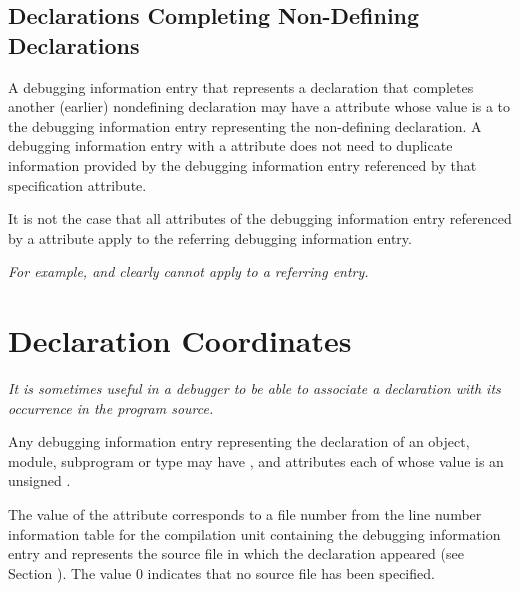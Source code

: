 \subsection{Declarations Completing Non-Defining Declarations}
A debugging information entry that represents a 
\hypertarget{chap:DWATspecificationincompletenondefiningorseparatedeclaration}{}
declaration that completes another (earlier) 
non\dash defining declaration may have a 
\DWATspecification{}
attribute whose value is a  to
the debugging information entry representing the non-defining declaration. A debugging
information entry with a 
\DWATspecification{} 
attribute does not need to duplicate information
provided by the debugging information entry referenced by that specification attribute.

It is not the case that all attributes of the debugging information entry referenced by a
\DWATspecification{} attribute 
apply to the referring debugging information entry.

\textit{For 
example,
\DWATsibling{} and 
\DWATdeclaration{} 
clearly cannot apply to a 
referring
entry.}



\section{Declaration Coordinates}
\label{chap:declarationcoordinates}
\textit{It is sometimes useful in a debugger to be able to associate
a declaration with its occurrence in the program source.}

Any debugging information 
\hypertarget{chap:DWATdeclfilefilecontainingsourcedeclaration}{}
entry 
\hypertarget{chap:DWATdecllinelinenumberofsourcedeclaration}{}
representing 
\hypertarget{chap:DWATdeclcolumncolumnpositionofsourcedeclaration}{}
the
declaration of an object, module, subprogram or
type 
may 
have
\DWATdeclfile, 
\DWATdeclline{} and 
\DWATdeclcolumn{}
attributes each of whose value is an unsigned
.

The value of 
the 
\DWATdeclfile{}
attribute 
corresponds to
a file number from the line number information table for the
compilation unit containing the debugging information entry and
represents the source file in which the declaration appeared
(see Section ). 
The value 0 indicates that no source file
has been specified.

